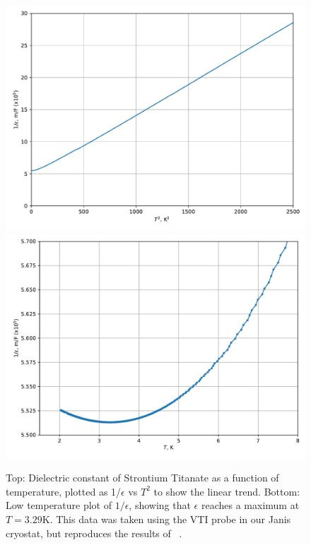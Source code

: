 \documentclass{thesis-umich}
\begin{document}
\begin{figure}
	\caption[Dielectric constant of Strontium Titanate]{Top: Dielectric constant of Strontium Titanate as a function
		of temperature, plotted as 1/$\epsilon$ vs $T^2$ to show the
		linear trend. Bottom: Low temperature plot of $1/\epsilon$,
		showing that $\epsilon$ reaches a maximum at $T = 3.29$K. This
		data was taken using the VTI probe in our Janis cryostat, but
		reproduces the results of ~\cite{Rowley2014}.}
		\includegraphics[width=0.9\columnwidth]{figures/STO_eps_vs_T.pdf}
		\includegraphics[width=0.9\columnwidth]{figures/STO_eps_vs_T_low.pdf}
		\label{sto_eps_vs_T} \end{figure}
\end{document}
